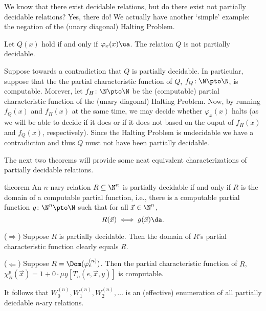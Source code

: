 \documentclass[class=article, crop=false]{standalone}
\begin{document}
We know that there exist decidable relations, but do there exist not partially decidable relations? Yes, there do! We actually have another `simple' example: the negation of the (unary diagonal) Halting Problem.
\begin{ex}
  Let $Q(x)$ hold if and only if $\varphi_x(x) \ua$. The relation $Q$ is not partially decidable.

  \begin{pf}
    Suppose towards a contradiction that $Q$ is partially decidable. In particular, suppose that the the partial characteristic function of $Q$, $f_Q \colon \N \pto \N$, is computable. Morever, let $f_H \colon \N \pto \N$ be the (computable) partial characteristic function of the (unary diagonal) Halting Problem. Now, by running $f_Q(x)$ and $f_H(x)$ at the same time, we may decide whether $\varphi_x(x)$ halts (as we will be able to decide if it does or if it does not based on the ouput of $f_H(x)$ and $f_Q(x)$, respectively). Since the Halting Problem is undecidable we have a contradiction and thus $Q$ must not have been partially decidable.
  \end{pf}
\end{ex}

The next two theorems will provide some neat equivalent characterizations of partially decidable relations.

\begin{result}{theorem}{\label{thm:partially-decidable-iff-domain-of-partial-function}}
  An $n$-nary relation $R \subseteq \N^n$ is partially decidable if and only if $R$ is the domain of a computable partial function, i.e., there is a computable partial function $g\colon \N^n \pto \N$ such that for all $\vec x \in \N^n$,
    \[
      R(\vec x) \iff g(\vec x) \da.
    \]
\end{result}
\begin{pf}
  ($\Rightarrow$) Suppose $R$ is partially decidable. Then the domain of $R$'s partial characteristic function clearly equals $R$.

  ($\Leftarrow$) Suppose $R = \Dom(\varphi_e^{(n)})$. Then the partial characteristic function of $R$, $\chi_R^p(\vec x) = 1 + 0 \cdot \mu y[T_n(e,\vec x,y)]$ is computable.
\end{pf}
\begin{rem}
  It follows that $W_0^{(n)}, W_1^{(n)}, W_2^{(n)}, \ldots$ is an (effective) enumeration of all partially deicdable $n$-ary relations.
\end{rem}
\end{document}
